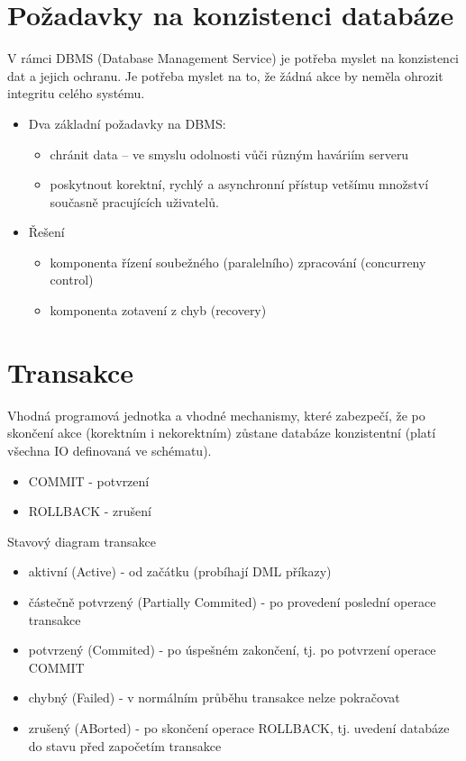 \documentclass{szzclass}
\begin{document}
\tableofcontents
\newpage

\section{Požadavky na konzistenci databáze}

V rámci DBMS (Database Management Service) je potřeba myslet na konzistenci dat a jejich ochranu. Je potřeba
myslet na to, že žádná akce by neměla ohrozit integritu celého systému.

\begin{itemize}
\item Dva základní požadavky na DBMS:
  \begin{itemize}
  \item chránit data – ve smyslu odolnosti vůči různým haváriím serveru
  \item poskytnout korektní, rychlý a asynchronní přístup vetšímu množství současně pracujících uživatelů.
  \end{itemize}
\item Řešení
  \begin{itemize}
  \item komponenta řízení soubežného (paralelního) zpracování (concurreny control)
  \item komponenta zotavení z chyb (recovery)
  \end{itemize}
\end{itemize}

\section{Transakce}

Vhodná programová jednotka a vhodné mechanismy, které zabezpečí, že po skončení akce (korektním i nekorektním) zůstane databáze konzistentní (platí všechna IO definovaná ve schématu).

\begin{itemize}
\item COMMIT - potvrzení
\item ROLLBACK - zrušení
\end{itemize}

Stavový diagram transakce

\begin{itemize}
\item aktivní (Active) - od začátku (probíhají DML příkazy)
\item částečně potvrzený (Partially Commited) - po provedení poslední operace transakce
\item potvrzený (Commited) - po úspešném zakončení, tj. po potvrzení operace COMMIT
\item chybný (Failed) - v normálním průběhu transakce nelze pokračovat
\item zrušený (ABorted) - po skončení operace ROLLBACK, tj. uvedení databáze do stavu před započetím transakce
\end{itemize}
\end{document}
